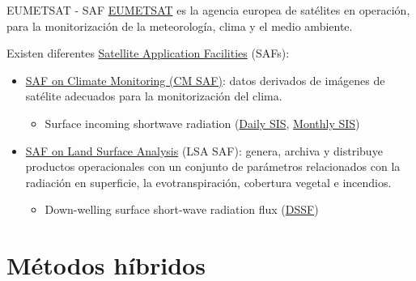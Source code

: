 \documentclass[aspectratio=169, usenames,svgnames,dvipsnames]{beamer}
\begin{document}
\begin{frame}[label={sec:org7e9535b}]{EUMETSAT - SAF}
\alert{\href{http://www.eumetsat.int}{EUMETSAT}} es la agencia europea de satélites en operación, para la monitorización de la meteorología, clima y el medio ambiente.
\vfill

Existen diferentes \alert{\href{https://www.eumetsat.int/about-us/satellite-application-facilities-safs}{Satellite Application Facilities} (SAFs)}:
\begin{itemize}
\item \href{https://wui.cmsaf.eu/safira/action/viewProduktSearch}{SAF on Climate Monitoring (CM SAF)}: datos derivados de imágenes de satélite adecuados para la monitorización del clima.
\begin{itemize}
\item \alert{Surface incoming shortwave radiation} (\href{https://wui.cmsaf.eu/safira/action/viewProduktDetails?eid=22482\&fid=36}{Daily SIS}, \href{https://wui.cmsaf.eu/safira/action/viewProduktDetails?eid=22483\&fid=36}{Monthly SIS})
\end{itemize}

\vfill

\item \href{https://landsaf.ipma.pt/en/}{SAF on Land Surface Analysis} (LSA SAF): genera, archiva y distribuye productos operacionales con un conjunto de parámetros relacionados con la radiación en superficie, la evotranspiración, cobertura vegetal e incendios.
\begin{itemize}
\item \alert{Down-welling surface short-wave radiation flux} (\href{https://landsaf.ipma.pt/en/products/longwave-shortwave-radiation/dssf/}{DSSF})
\end{itemize}
\end{itemize}
\end{frame}
\section{Métodos híbridos}
\label{sec:orgc2cab3e}
\end{document}
